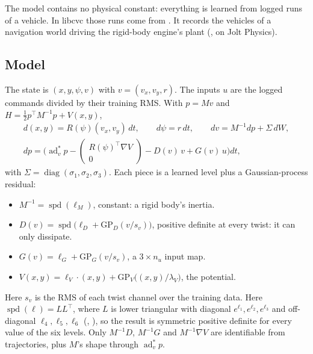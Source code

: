 \documentclass[11pt]{article}
\theoremstyle{remark}
\newcommand{\T}{^{\top}}
\begin{document}
The model contains no physical constant: everything is learned from logged runs of a vehicle. In
libcvc those runs come from . It records the vehicles of a navigation
world driving the rigid-body engine's plant (, on Jolt Physics).

\subsection{Model}
The state is $(x,y,\psi,v)$ with $v=(v_x,v_y,r)$. The inputs $u$ are the logged commands divided
by their training RMS. With $p=Mv$ and $H=\tfrac12p\T M^{-1}p+V(x,y)$,
\begin{equation}
\begin{gathered}
  d(x,y)=R(\psi)(v_x,v_y)\,dt,\qquad d\psi=r\,dt,\qquad dv=M^{-1}dp+\Sigma\,dW,\\
  dp=\Big(\operatorname{ad}^*_vp-\begin{pmatrix}R(\psi)\T\nabla V\\0\end{pmatrix}-D(v)\,v+G(v)\,u\Big)dt,
\end{gathered}
  \label{eq:learned}
\end{equation}
with $\Sigma=\operatorname{diag}(\sigma_1,\sigma_2,\sigma_3)$. Each piece is a learned level plus a
Gaussian-process residual:
\begin{itemize}
  \item $M^{-1}=\operatorname{spd}(\ell_M)$, constant: a rigid body's inertia.
  \item $D(v)=\operatorname{spd}\big(\ell_D+\mathrm{GP}_D(v/s_v)\big)$, positive definite at every
        twist: it can only dissipate.
  \item $G(v)=\ell_G+\mathrm{GP}_G(v/s_v)$, a $3\times n_u$ input map.
  \item $V(x,y)=\ell_V\cdot(x,y)+\mathrm{GP}_V\big((x,y)/\lambda_V\big)$, the potential.
\end{itemize}
Here $s_v$ is the RMS of each twist channel over the training data. Here
$\operatorname{spd}(\ell)=LL\T$, where $L$ is lower triangular with diagonal $e^{\ell_1},e^{\ell_2},e^{\ell_3}$
and off-diagonal $\ell_4,\ell_5,\ell_6$ (, ), so the result is
symmetric positive definite for every value of the six levels. Only $M^{-1}D$, $M^{-1}G$ and
$M^{-1}\nabla V$ are identifiable from trajectories, plus $M$'s shape through
$\operatorname{ad}^*_vp$.
\end{document}
